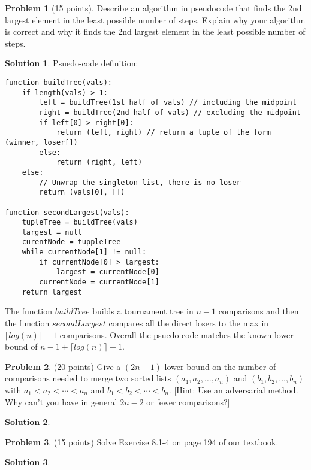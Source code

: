 \documentclass{article}
\theoremstyle{definition}
\newtheorem{problem}{Problem}
\newtheorem*{solution}{Solution}
\begin{document}
\begin{problem}[15 points]
Describe an algorithm in pseudocode that finds the 2nd largest element
in the least possible number of steps. Explain why your algorithm is
correct and why it finds the 2nd largest element in the least possible
number of steps. 
\end{problem}
\begin{solution}
Psuedo-code definition:\\
\begin{verbatim}
function buildTree(vals):
    if length(vals) > 1:
        left = buildTree(1st half of vals) // including the midpoint
        right = buildTree(2nd half of vals) // excluding the midpoint
        if left[0] > right[0]:
            return (left, right) // return a tuple of the form (winner, loser[])
        else:
            return (right, left)
    else:
        // Unwrap the singleton list, there is no loser
        return (vals[0], [])
        
function secondLargest(vals):
    tupleTree = buildTree(vals)
    largest = null
    curentNode = tuppleTree
    while currentNode[1] != null:
        if currentNode[0] > largest:
            largest = currentNode[0]
        currentNode = currentNode[1]
    return largest
\end{verbatim}
The function $buildTree$ builds a tournament tree in $n-1$ comparisons and then the function $secondLargest$ compares all the direct losers to the max in $\lceil log(n) \rceil - 1$ comparisons. Overall the psuedo-code matches the known lower bound of $n-1 + \lceil log(n) \rceil - 1$.
\end{solution}

\begin{problem} (20 points)
Give a $(2n-1)$ lower bound on the number of comparisons needed to
merge two sorted lists $(a_1,a_2,\ldots,a_n)$ and $(b_1,b_2,\ldots,
b_n)$ with $a_1<a_2<\cdots <a_n$ and $b_1<b_2<\cdots <b_n$. 
[Hint: Use an adversarial method. Why can't you have in general $2n-2$ or fewer 
comparisons?] 
\end{problem}
\begin{solution}

\end{solution}

\begin{problem}(15 points) 
Solve Exercise 8.1-4 on page 194 of our textbook. 
\end{problem}
\begin{solution}
\end{solution}
\end{document}
